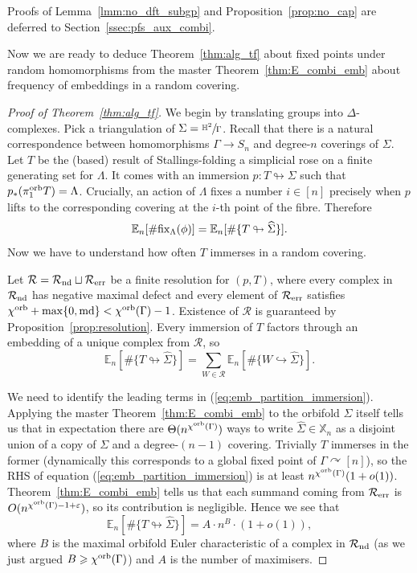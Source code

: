 \documentclass{amsart}
\newcommand{\cho}{\chi^{\textnormal{orb}}}
\newcommand{\covers}{\mathbb{X}_n}
\newcommand{\md}{\textnormal{md}}
\newcommand{\pio}{\pi_1^{\textnormal{orb}}}
\newcommand{\tn}{\textnormal}
\newcommand{\whS}{{\widehat{\Sigma}}}
\begin{document}
Proofs of Lemma~\ref{lmm:no_dft_subgp} and Proposition~\ref{prop:no_cap} are deferred to Section~\ref{ssec:pfs_aux_combi}.

\medskip

Now we are ready to deduce Theorem~\ref{thm:alg_tf} about fixed points under random homomorphisms from the master Theorem~\ref{thm:E_combi_emb} about frequency of embeddings in a random covering.
\begin{proof}[Proof of Theorem~\ref{thm:alg_tf}]
We begin by translating groups into $\Delta$-complexes. Pick a triangulation of $\Sigma=\sfrac{\mathbb{H}^2}{\Gamma}$. Recall that there is a natural correspondence between homomorphisms $\Gamma\to S_n$ and degree-$n$ coverings of $\Sigma$. Let $T$ be the (based) result of Stallings-folding a simplicial rose on a finite generating set for $\Lambda$. It comes with an immersion $p\colon T\looparrowright\Sigma$ such that $p_*(\pio T)=\Lambda$. Crucially, an action of $\Lambda$ fixes a number $i\in[n]$ precisely when $p$ lifts to the corresponding covering at the $i$-th point of the fibre. Therefore
\begin{equation*}
\mathbb{E}_n[\#\tn{fix}_\Lambda(\phi)]=\mathbb{E}_n[\#\{T\looparrowright\whS\}].
\end{equation*}
Now we have to understand how often $T$ immerses in a random covering.

Let $\mathcal{R}=\mathcal{R}_\tn{nd}\sqcup\mathcal{R}_\tn{err}$ be a finite resolution for $(p,T)$, where every complex in $\mathcal{R}_\tn{nd}$ has negative maximal defect and every element of $\mathcal{R}_\tn{err}$ satisfies $\cho+\max\{0,\md\}<\cho(\Gamma)-1$. Existence of $\mathcal{R}$ is guaranteed by Proposition~\ref{prop:resolution}. Every immersion of $T$ factors through an embedding of a unique complex from $\mathcal{R}$, so
\begin{equation}\label{eq:emb_partition_immersion}
\mathbb{E}_n[\#\{T\looparrowright\whS\}]=\sum_{W\in\mathcal{R}}\mathbb{E}_n[\#\{W\hookrightarrow\whS\}].
\end{equation}

We need to identify the leading terms in (\ref{eq:emb_partition_immersion}). Applying the master Theorem~\ref{thm:E_combi_emb} to the orbifold $\Sigma$ itself tells us that in expectation there are $\Theta(n^{\cho(\Gamma)})$ ways to write $\whS\in\covers$ as a disjoint union of a copy of $\Sigma$ and a degree-$(n-1)$ covering. Trivially $T$ immerses in the former (dynamically this corresponds to a global fixed point of $\Gamma\curvearrowright[n]$), so the RHS of equation (\ref{eq:emb_partition_immersion}) is at least $n^{\cho(\Gamma)}(1+o(1))$. Theorem~\ref{thm:E_combi_emb} tells us that each summand coming from $\mathcal{R}_\tn{err}$ is $O(n^{\cho(\Gamma)-1+\varepsilon})$, so its contribution is negligible. Hence we see that
\begin{equation*}
\mathbb{E}_n[\#\{T\looparrowright\whS\}]=A\cdot n^B\cdot(1+o(1)),
\end{equation*}
where $B$ is the maximal orbifold Euler characteristic of a complex in $\mathcal{R}_\tn{nd}$ (as we just argued $B\geqslant\cho(\Gamma)$) and $A$ is the number of maximisers.


\end{proof}
\end{document}

